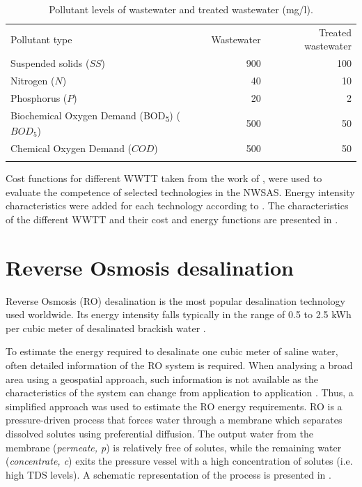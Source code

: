 \documentclass[12pt]{iopart}
\begin{document}
\begin{table}[!ht]
	\caption{\label{tbl:pollutans}Pollutant levels of wastewater and treated wastewater (mg/l).}
	\begin{indented}
	\item[]\begin{tabular}{@{}l r r}
		\br
		Pollutant type & Wastewater & Treated wastewater\\
		\mr
		Suspended solids ($SS$) & 900 & 100\\
		Nitrogen ($N$) & 40 & 10\\
		Phosphorus ($P$) & 20 & 2\\
		Biochemical Oxygen Demand (BOD\textsubscript{5}) ($BOD_5$) & 500 & 50\\
		Chemical Oxygen Demand ($COD$)& 500 & 50\\
		\br
	\end{tabular}
	\end{indented}
\end{table}

Cost functions for different WWTT taken from the work of \citet{Assessmentwastewatertreatment2012}, were used to evaluate the competence of selected technologies in the NWSAS. Energy intensity characteristics were added for each technology according to \cite{Energypatternanalysis2012,ComparativeAnalysisEnergy2017}. The characteristics of the different WWTT and their cost and energy functions are presented in .



\section{Reverse Osmosis desalination}\label{Sc:RO}
Reverse Osmosis (RO) desalination is the most popular desalination technology used worldwide. Its energy intensity falls typically in the range of 0.5 to 2.5 kWh per cubic meter of desalinated brackish water \cite{Energyoptimalgroundwater2013}.

To estimate the energy required to desalinate one cubic meter of saline water, often detailed information of the RO system is required. When analysing a broad area using a geospatial approach, such information is not available as the characteristics of the system can change from application to application \cite{stillwellPredictingSpecificEnergy2016,aminfardMultilayeredSpatialMethodology2019}. Thus, a simplified approach was used to estimate the RO energy requirements. RO is a pressure-driven process that forces water through a membrane which separates dissolved solutes using preferential diffusion. The output water from the membrane (\textit{permeate, p}) is relatively free of solutes, while the remaining water (\textit{concentrate, c}) exits the pressure vessel with a high concentration of solutes (i.e. high TDS levels). A schematic representation of the process is presented in  \cite{crittenden_mwhs_2012}.
\end{document}
